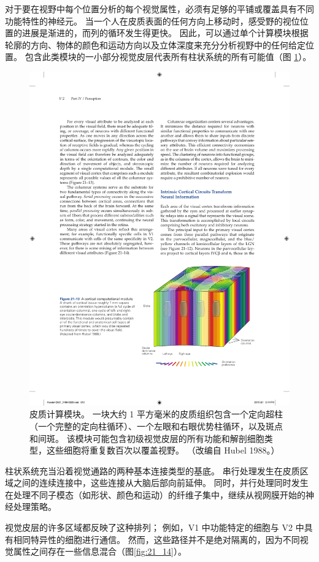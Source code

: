 对于要在视野中每个位置分析的每个视觉属性，必须有足够的平铺或覆盖具有不同功能特性的神经元。 
当一个人在皮质表面的任何方向上移动时，感受野的视位位置的进展是渐进的，而列的循环发生得更快。 
因此，可以通过单个计算模块根据轮廓的方向、物体的颜色和运动方向以及立体深度来充分分析视野中的任何给定位置。 
包含此类模块的一小部分视觉皮层代表所有柱状系统的所有可能值（图 \ref{fig:21_13}）。

\begin{figure}[htbp]
	\centering
	\includegraphics[width=0.7\linewidth]{chap21/fig_21_13}
	\caption{皮质计算模块。 
		一块大约 1 平方毫米的皮质组织包含一个定向超柱（一个完整的定向柱循环）、一个左眼和右眼优势柱循环，以及斑点和间斑。
		该模块可能包含初级视觉皮层的所有功能和解剖细胞类型，这些细胞将重复数百次以覆盖视野。 （改编自 Hubel 1988。）}
	\label{fig:21_13}
\end{figure}


柱状系统充当沿着视觉通路的两种基本连接类型的基底。
串行处理发生在皮质区域之间的连续连接中，这些连接从大脑后部向前延伸。
同时，并行处理同时发生在处理不同子模态（如形状、颜色和运动）的纤维子集中，继续从视网膜开始的神经处理策略。


视觉皮层的许多区域都反映了这种排列； 
例如，V1 中功能特定的细胞与 V2 中具有相同特异性的细胞进行通信。 
然而，这些路径并不是绝对隔离的，因为不同视觉属性之间存在一些信息混合（图\ref{fig:21_14}）。


